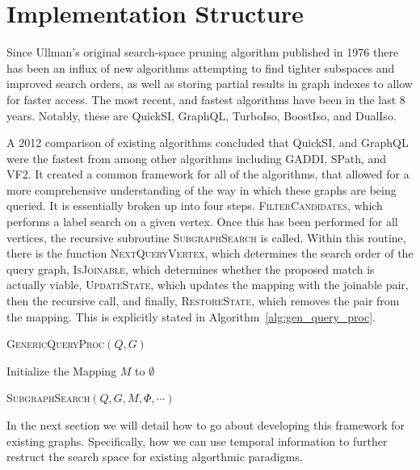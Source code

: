 \section{Implementation Structure}

Since Ullman's original search-space pruning algorithm published in 1976 there
has been an influx of new algorithms attempting to find tighter subspaces and
improved search orders, as well as storing partial results in graph indexes to
allow for faster access.  The most recent, and fastest algorithms have been in
the last 8 years. Notably, these are QuickSI, GraphQL, TurboIso, BoostIso, and
DualIso.

A 2012 comparison of existing algorithms concluded that QuickSI, and GraphQL
were the fastest from among other algorithms including GADDI, SPath, and
VF2. It created a common framework for all of the algorithms, that allowed for a
more comprehensive understanding of the way in which these graphs are being
queried. It is essentially broken up into four steps. \textsc{FilterCandidates},
which performs a label search on a given vertex.  Once this has been performed
for all vertices, the recursive subroutine \textsc{SubgraphSearch} is
called. Within this routine, there is the function \textsc{NextQueryVertex},
which determines the search order of the query graph, \textsc{IsJoinable}, which
determines whether the proposed match is actually viable, \textsc{UpdateState},
which updates the mapping with the joinable pair, then the recursive call, and finally,
\textsc{RestoreState}, which removes the pair from the mapping. This is
explicitly stated in Algorithm~\ref{alg:gen_query_proc}.

\begin{algorithm}
  \label{alg:gen_query_proc}
  \caption{\textsc{GenericQueryProc}$(Q,G)$}
  \SetAlgoLined

  Initialize the Mapping $M$ to $\emptyset$\;

  \textsc{SubgraphSearch}$(Q,G,M,\Phi, \cdots)$\;

  \setcounter{AlgoLine}{0}
\end{algorithm}

In the next section we will detail how to go about developing this framework for
existing graphs. Specifically, how we can use temporal information to further
restruct the search space for existing algorthmic paradigms.
